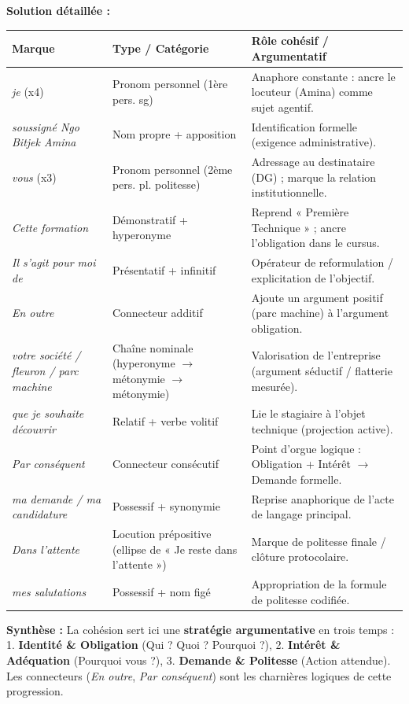 \documentclass[11pt]{article}
\begin{document}
\begin{exoresolu}
\textbf{Solution détaillée :}
\begin{center}
\begin{tabularx}{\linewidth}{|l|X|X|}\hline
\rowcolor{popblueL}
\textbf{Marque} & \textbf{Type / Catégorie} & \textbf{Rôle cohésif / Argumentatif} \\ \hline
\emph{je} (x4) & Pronom personnel (1ère pers. sg) & Anaphore constante : ancre le locuteur (Amina) comme sujet agentif. \\ \hline
\emph{soussigné Ngo Bitjek Amina} & Nom propre + apposition & Identification formelle (exigence administrative). \\ \hline
\emph{vous} (x3) & Pronom personnel (2ème pers. pl. politesse) & Adressage au destinataire (DG) ; marque la relation institutionnelle. \\ \hline
\emph{Cette formation} & Démonstratif + hyperonyme & Reprend « Première Technique » ; ancre l'obligation dans le cursus. \\ \hline
\emph{Il s'agit pour moi de} & Présentatif + infinitif & Opérateur de reformulation / explicitation de l'objectif. \\ \hline
\emph{En outre} & Connecteur additif & Ajoute un argument positif (parc machine) à l'argument obligation. \\ \hline
\emph{votre société / fleuron / parc machine} & Chaîne nominale (hyperonyme $\rightarrow$ métonymie $\rightarrow$ métonymie) & Valorisation de l'entreprise (argument séductif / flatterie mesurée). \\ \hline
\emph{que je souhaite découvrir} & Relatif + verbe volitif & Lie le stagiaire à l'objet technique (projection active). \\ \hline
\emph{Par conséquent} & Connecteur consécutif & Point d'orgue logique : Obligation + Intérêt $\rightarrow$ Demande formelle. \\ \hline
\emph{ma demande / ma candidature} & Possessif + synonymie & Reprise anaphorique de l'acte de langage principal. \\ \hline
\emph{Dans l'attente} & Locution prépositive (ellipse de « Je reste dans l'attente ») & Marque de politesse finale / clôture protocolaire. \\ \hline
\emph{mes salutations} & Possessif + nom figé & Appropriation de la formule de politesse codifiée. \\ \hline
\end{tabularx}
\end{center}
\textbf{Synthèse :} La cohésion sert ici une \textbf{stratégie argumentative} en trois temps : 1. \textbf{Identité \& Obligation} (Qui ? Quoi ? Pourquoi ?), 2. \textbf{Intérêt \& Adéquation} (Pourquoi vous ?), 3. \textbf{Demande \& Politesse} (Action attendue). Les connecteurs (\emph{En outre}, \emph{Par conséquent}) sont les charnières logiques de cette progression.
\end{exoresolu}
\end{document}
